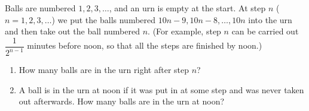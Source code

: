 Balls are numbered $1,2,3,\dots$, and an urn is empty at the start. At step $n$ ($n=1,2,3,\dots$) we put the balls numbered $10n-9,10n-8,\dots,10n$ into the urn and then take out the ball numbered $n$. (For example, step $n$ can be carried out $\dfrac{1}{2^{n-1}}$ minutes before noon, so that all the steps are finished by noon.)
\begin{enumerate}
\item[(a)] How many balls are in the urn right after step $n$?
\item[(b)] A ball is in the urn at noon if it was put in at some step and was never taken out afterwards. How many balls are in the urn at noon?
\end{enumerate}
